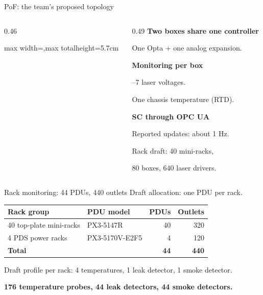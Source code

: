 \documentclass[aspectratio=169,11pt]{beamer}
\begin{document}
\begin{frame}{PoF: the team's proposed topology}
  \begin{columns}[c,onlytextwidth]
    \begin{column}{0.46\textwidth}
      \centering
      \begin{adjustbox}{max width=\linewidth,max totalheight=5.7cm}
        
      \end{adjustbox}
    \end{column}
    \begin{column}{0.49\textwidth}
      \textbf{Two boxes share one controller}\par
      \medskip
      One Opta + one analog expansion.\par
      \bigskip
      \textbf{Monitoring per box}\par
      --7 laser voltages.\par
      One chassis temperature (RTD).\par
      \bigskip
      \textbf{SC through OPC UA}\par
      \medskip
      Reported updates: about 1 Hz.\par
      \bigskip
      Rack draft: 40 mini-racks,\par
      80 boxes, 640 laser drivers.
    \end{column}
  \end{columns}
\end{frame}

\begin{frame}{Rack monitoring: 44 PDUs, 440 outlets}
  Draft allocation: one PDU per rack.\par
  \medskip
  \renewcommand{\arraystretch}{1.30}
  \begin{tabularx}{\textwidth}{@{}Xlrr@{}}
    \toprule
    Rack group & PDU model & PDUs & Outlets\\
    \midrule
    40 top-plate mini-racks & PX3-5147R & 40 & 320\\
    4 PDS power racks & PX3-5170V-E2F5 & 4 & 120\\
    \midrule
    \textbf{Total} & & \textbf{44} & \textbf{440}\\
    \bottomrule
  \end{tabularx}\par
  \bigskip
  Draft profile per rack: 4 temperatures, 1 leak detector, 1 smoke detector.\par
  \medskip
  \textbf{176 temperature probes, 44 leak detectors, 44 smoke detectors.}
\end{frame}
\end{document}
